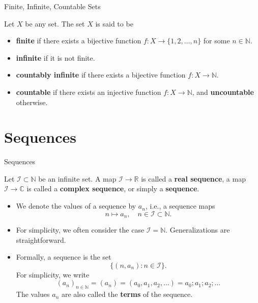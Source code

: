 \documentclass[dvipsnames]{beamer}
\theoremstyle{plain}
\theoremstyle{definition}
\begin{document}
\begin{frame}{Finite, Infinite, Countable Sets}

\begin{definition}
Let \(X\) be any set. The set \(X\) is said to be

\begin{itemize}
    \item \textbf{finite} if there exists a bijective function \(f : X \to \{1, 2, \dots, n\}\) for some \(n \in \mathbb{N}\).
    \item \textbf{infinite} if it is not finite.
    \item \textbf{countably infinite} if there exists a bijective function \(f : X \to \mathbb{N}\).
    \item \textbf{countable} if there exists an injective function \(f : X \to \mathbb{N}\), and \textbf{uncountable} otherwise.
\end{itemize}
\end{definition}

\end{frame}


\section{Sequences}

\begin{frame}{Sequences}

\begin{definition}
Let \(\mathcal{I} \subset \mathbb{N}\) be an infinite set.  
A map \(\mathcal{I} \to \mathbb{R}\) is called a \textbf{real sequence},  
a map \(\mathcal{I} \to \mathbb{C}\) is called a \textbf{complex sequence}, or simply a \textbf{sequence}.
\end{definition}


\footnotesize
\begin{itemize}
    \item We denote the values of a sequence by \(a_n\), i.e., a sequence maps
    \[
    n \mapsto a_n, \quad n \in \mathcal{I} \subset \mathbb{N}.
    \]
    \item For simplicity, we often consider the case \(\mathcal{I} = \mathbb{N}\).  
    Generalizations are straightforward.
    \item Formally, a sequence is the set 
    \[
    \{ (n, a_n) : n \in \mathcal{I} \}.
    \]  
    For simplicity, we write 
    \[
    (a_n)_{n \in \mathbb{N}} = (a_n) = (a_0, a_1, a_2, \dots) = a_0; a_1; a_2; \dots
    \]
    The values \(a_n\) are also called the \textbf{terms} of the sequence.
\end{itemize}

\end{frame}
\end{document}
